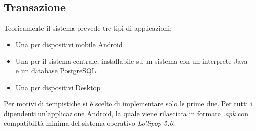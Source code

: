 \subsection{Transazione}
Teoricamente il sistema prevede tre tipi di applicazioni:
\begin{itemize}
	\item Una per dispositivi mobile Android
	\item Una per il sistema centrale, installabile su un sistema con un interprete Java e un database PostgreSQL
	\item Una per dispositivi Desktop 
\end{itemize}
Per motivi di tempistiche si è scelto di implementare solo le prime due. Per tutti i dipendenti un'applicazione Android, la quale viene rilasciata in formato \textit{.apk} con compatibilità minima del sistema operativo \textit{Lollipop 5.0}.

